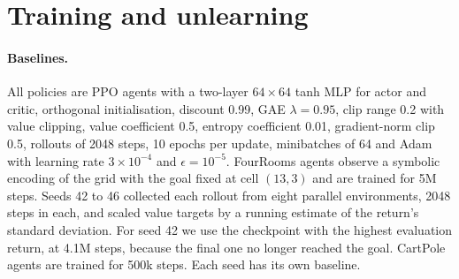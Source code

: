 \documentclass{article}
\begin{document}



\section{Training and unlearning}
\label{app:methods}

\paragraph{Baselines.} All policies are PPO agents with a two-layer
$64\times64$ tanh MLP for actor and critic, orthogonal initialisation,
discount 0.99, GAE $\lambda=0.95$, clip range 0.2 with value clipping,
value coefficient 0.5, entropy coefficient 0.01, gradient-norm clip 0.5,
rollouts of 2048 steps, 10 epochs per update, minibatches of 64 and Adam
with learning rate $3\times10^{-4}$ and $\epsilon=10^{-5}$. FourRooms
agents observe a symbolic encoding of the grid with the goal fixed at cell
$(13,3)$ and are trained for 5M steps. Seeds 42 to 46 collected each
rollout from eight parallel environments, 2048 steps in each, and scaled
value targets by a running estimate of the return's standard deviation.
For seed 42 we use the checkpoint with the highest evaluation return, at
4.1M steps, because the final one no longer reached the goal. CartPole
agents are trained for 500k steps. Each seed has its own baseline.
\end{document}

